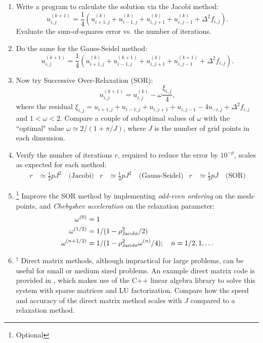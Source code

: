 \documentclass[11pt]{article}
\begin{document}
\begin{enumerate}
\item Write a program to calculate the solution via the Jacobi method:
\begin{equation}
u_{i,j}^{(k+1)} = 	\frac{1}{4}\left( u_{i+1,j}^{(k)} + u_{i-1,j}^{(k)} + u_{i,j+1}^{(k)} + u_{i,j-1}^{(k)} + \Delta^2 f_{i,j}\right).
\end{equation}
Evaluate the sum-of-squares error vs. the number of iterations. 
\item Do the same for the Gauss-Seidel method:
\begin{equation}
u_{i,j}^{(k+1)}  = \frac{1}{4}\left( u_{i+1,j}^{(k)} + u_{i-1,j}^{(k+1)} + u_{i,j+1}^{(k)} + u_{i,j-1}^{(k+1)} + \Delta^2 f_{i,j}\right).
\end{equation}
\item Now try Successive Over-Relaxation (SOR):
\begin{equation}
u_{i,j}^{(k+1)}  = u_{i,j}^{(k)} -\omega \frac{\xi_{i,j}}{4},
\end{equation}
where the residual $\xi_{i,j} = u_{i+1,j} + u_{i-1,j} + u_{i,j+1} + u_{i,j-1} - 4 u_{-i,j} + \Delta^2 f_{i,j}$ and $1 < \omega < 2$. Compare a couple of  suboptimal values of $\omega$ with the ``optimal" value  $\omega \simeq 2 / ( 1 + \pi /J)$, where $J$ is the number of grid points in each dimension.
\item Verify the number of iterations $r$, required to reduce the error by $10^{-p}$, scales as expected for each method:
\begin{align}
r & \simeq \tfrac{1}{2} p J^2 \quad \textrm{(Jacobi)} & r & \simeq \tfrac{1}{4} p J^2 \quad \textrm{(Gauss-Seidel)} &  r & \simeq \tfrac{1}{3} p J \quad \textrm{(SOR)}
\end{align}  
\item\footnote[2]{Optional}  Improve the SOR method by implementing \emph{odd-even ordering} on the mesh-points, and \emph{Chebyshev acceleration} on the relaxation parameter:
\begin{align}
\omega^{(0)} &= 1 \nonumber \\
\omega^{(1/2)} &= 1/(1- \rho_{\rm{Jacobi}}^2/2)  \\
\omega^{(n+ 1/2)} &= 1/(1- \rho_{\rm{Jacobi}}^2 \omega^{(n)}/4); \quad n = 1/2,1,\dots   \nonumber
\end{align}
\item $^\dagger$ Direct matrix methods, although impractical for large problems, can be useful for small or medium sized problems. An example direct matrix code is provided in , which makes use of the C++ linear algebra library  to solve this system with sparse matrices and LU factorization.  Compare how the speed and accuracy of the direct matrix method scales with $J$ compared to a relaxation method. 
\end{enumerate}
\end{document}
